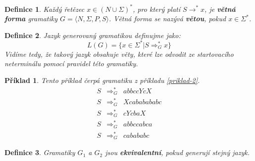 \documentclass[10pt, a4paper, titlepage]{article}
\theoremstyle{note}
\newtheorem{definice}{\textbf{Definice}}
\newtheorem{priklad}{\textbf{Příklad}}
\begin{document}
\begin{definice}
Každý řetězec $x \in (N \cup\Sigma)^{*}$, pro který platí $S \rightarrow^{*} x$, je \textbf{větná forma} gramatiky $G = \langle N, \Sigma, P, S \rangle$.
Větná forma se nazývá \textbf{větou}, pokud $x \in \Sigma^{*}$.
\end{definice}

\begin{definice}
Jazyk generovaný gramatikou definujme jako:
$$
L(G) = \lbrace x \in \Sigma^{*} | S \Rightarrow_{G}^{*} x \rbrace
$$
Vidíme tedy, že takový jazyk obsahuje \emph{věty}, které lze odvodit ze startovacího neterminálu pomocí pravidel této gramatiky.
\end{definice}

\begin{priklad}
Tento příklad čerpá gramatiku z příkladu \ref{priklad-2}.
\begin{eqnarray*}
S &\Rightarrow_{G}^{*}& abbccYcX \\
S &\Rightarrow_{G}^{*}& Xcababababc \\
S &\Rightarrow_{G}^{*}& cYcbaX \\
S &\Rightarrow_{G}^{*}& abbccabca \\
S &\Rightarrow_{G}^{*}& cabababc
\end{eqnarray*}
\end{priklad}

\begin{definice}
Gramatiky $G_{1}$ a $G_{2}$ jsou \textbf{ekvivalentní}, pokud generují stejný jazyk.
\end{definice}
\end{document}
